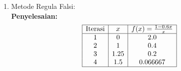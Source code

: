 \documentclass{article}
\newcommand{\penyelesaian}{\textbf{Penyelesaian: }}
\begin{document}
\begin{enumerate}
\begin{enumerate}
        \item Metode Regula Falsi: \\
        \penyelesaian   \[
                        \begin{array}{|c|c|c|}
                        \hline
                        \text{Iterasi} & x & f(x) = \frac{1 - 0.6x}{x} \\
                        \hline
                        1 & 0 & 2.0 \\
                        2 & 1 & 0.4 \\
                        3 & 1.25 & 0.2 \\
                        4 & 1.5 & 0.066667 \\
                        \hline
                        \end{array}
                        \]

    \end{enumerate}

\end{enumerate}
\end{document}
